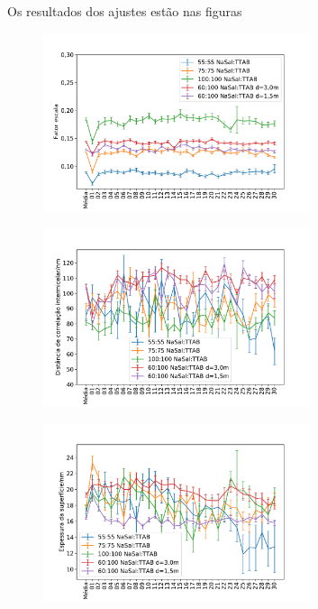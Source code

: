 	Os resultados dos ajustes estão nas figuras 
	
	\begin{figure}
		\centering
		\includegraphics[width=0.7\textwidth]{imagens/saxs/param_scale}
		\caption{}
		\label{fig:param_scale}
	\end{figure}

	\begin{figure}
		\centering
		\includegraphics[width=0.7\textwidth]{imagens/saxs/param_d_cq}
		\caption{}
		\label{fig:param_dcq}
	\end{figure}

	\begin{figure}
		\centering
		\includegraphics[width=0.7\textwidth]{imagens/saxs/param_d_head}
		\caption{}
		\label{fig:param_dhead}
	\end{figure}

